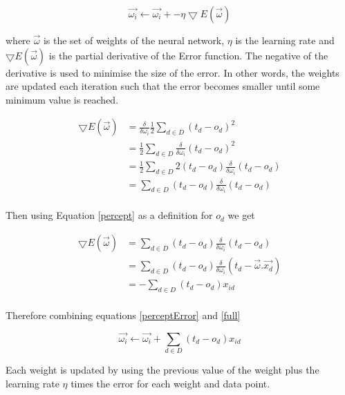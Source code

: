 \documentclass[10pt,a4paper]{article}
\begin{document}
\begin{equation}
\label{perceptError}
\vec{\omega_i} \leftarrow \vec{\omega_i} + -\eta\bigtriangledown E(\vec{\omega})
\end{equation}

where $\vec{\omega}$ is the set of weights of the neural network, $\eta$ is the learning rate and $\bigtriangledown E(\vec{\omega})$ is the partial derivative of the Error function. The negative of the derivative is used to minimise the size of the error. In other words, the weights are updated each iteration such that the error becomes smaller until some minimum value is reached.


\begin{equation}
\begin{split}
\bigtriangledown E(\vec{\omega}) &= \frac{\delta}{\delta \omega_i} \frac{1}{2}\sum_{d \in D} (t_d-o_d)^2 \\
&=  \frac{1}{2}\sum_{d \in D} \frac{\delta}{\delta \omega_i}(t_d-o_d)^2 \\
&=  \frac{1}{2}\sum_{d \in D} 2(t_d - o_d) \frac{\delta}{\delta \omega_i}(t_d-o_d) \\
&=  \sum_{d \in D} (t_d - o_d) \frac{\delta}{\delta \omega_i}(t_d-o_d) \\
\end{split}
\end{equation}

Then using Equation \ref{percept} as a definition for $o_d$ we get

\begin{equation}
\label{full}
\begin{split}
\bigtriangledown E(\vec{\omega}) &= \sum_{d \in D} (t_d - o_d) \frac{\delta}{\delta \omega_i}(t_d-o_d) \\
&=  \sum_{d \in D} (t_d - o_d) \frac{\delta}{\delta \omega_i}(t_d-\vec{\omega}.\vec{x_d}) \\
&= -  \sum_{d \in D} (t_d - o_d)x_{id} \\
\end{split}
\end{equation}

Therefore combining equations \ref{perceptError} and \ref{full}

\begin{equation}
\vec{\omega_i} \leftarrow \vec{\omega_i} + \sum_{d \in D} (t_d - o_d)x_{id} 
\end{equation}

Each weight is updated by using the previous value of the weight plus the learning rate $\eta$ times the error for each weight and data point.
\end{document}
